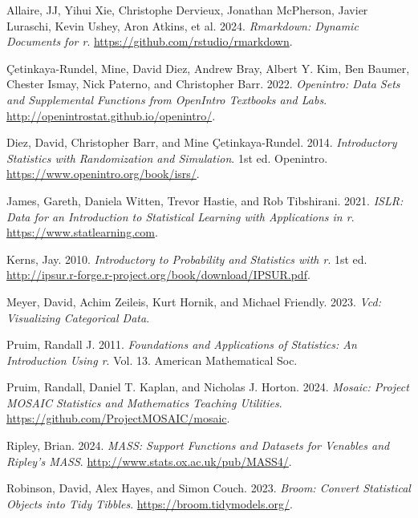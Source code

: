 \documentclass[
  letterpaper,
  DIV=11,
  numbers=noendperiod]{scrreprt}
\newlength{\cslhangindent}
\newenvironment{CSLReferences}[2] %
 {\begin{list}{}{%
  \setlength{\itemindent}{0pt}
  \setlength{\leftmargin}{0pt}
  \setlength{\parsep}{0pt}
  \ifodd #1
   \setlength{\leftmargin}{\cslhangindent}
   \setlength{\itemindent}{-1\cslhangindent}
  \fi
  \setlength{\itemsep}{#2\baselineskip}}}
 {\end{list}}
\begin{document}
\label{refs}
\begin{CSLReferences}{1}{0}
Allaire, JJ, Yihui Xie, Christophe Dervieux, Jonathan McPherson, Javier
Luraschi, Kevin Ushey, Aron Atkins, et al. 2024. \emph{Rmarkdown:
Dynamic Documents for r}. \url{https://github.com/rstudio/rmarkdown}.

Çetinkaya-Rundel, Mine, David Diez, Andrew Bray, Albert Y. Kim, Ben
Baumer, Chester Ismay, Nick Paterno, and Christopher Barr. 2022.
\emph{Openintro: Data Sets and Supplemental Functions from OpenIntro
Textbooks and Labs}. \url{http://openintrostat.github.io/openintro/}.

Diez, David, Christopher Barr, and Mine Çetinkaya-Rundel. 2014.
\emph{Introductory Statistics with Randomization and Simulation}. 1st
ed. Openintro. \url{https://www.openintro.org/book/isrs/}.

James, Gareth, Daniela Witten, Trevor Hastie, and Rob Tibshirani. 2021.
\emph{ISLR: Data for an Introduction to Statistical Learning with
Applications in r}. \url{https://www.statlearning.com}.

Kerns, Jay. 2010. \emph{Introductory to Probability and Statistics with
r}. 1st ed.
\url{http://ipsur.r-forge.r-project.org/book/download/IPSUR.pdf}.

Meyer, David, Achim Zeileis, Kurt Hornik, and Michael Friendly. 2023.
\emph{Vcd: Visualizing Categorical Data}.

Pruim, Randall J. 2011. \emph{Foundations and Applications of
Statistics: An Introduction Using r}. Vol. 13. American Mathematical
Soc.

Pruim, Randall, Daniel T. Kaplan, and Nicholas J. Horton. 2024.
\emph{Mosaic: Project MOSAIC Statistics and Mathematics Teaching
Utilities}. \url{https://github.com/ProjectMOSAIC/mosaic}.

Ripley, Brian. 2024. \emph{MASS: Support Functions and Datasets for
Venables and Ripley's MASS}. \url{http://www.stats.ox.ac.uk/pub/MASS4/}.

Robinson, David, Alex Hayes, and Simon Couch. 2023. \emph{Broom: Convert
Statistical Objects into Tidy Tibbles}.
\url{https://broom.tidymodels.org/}.


\end{CSLReferences}
\end{document}
